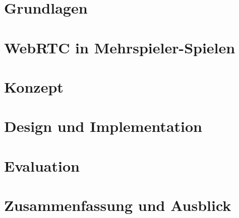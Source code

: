 \documentclass[oneside,11pt,a4paper,bibliography=totocnumbered,numbers=noenddot]{scrreprt}
\begin{document}
\chapter{Grundlagen}


\chapter{WebRTC in Mehrspieler-Spielen}


\chapter{Konzept}


\chapter{Design und Implementation}


\chapter{Evaluation}
%
\chapter{Zusammenfassung und Ausblick}
%

%

\begin{singlespace}

\end{singlespace}
\clearpage

\end{document}
